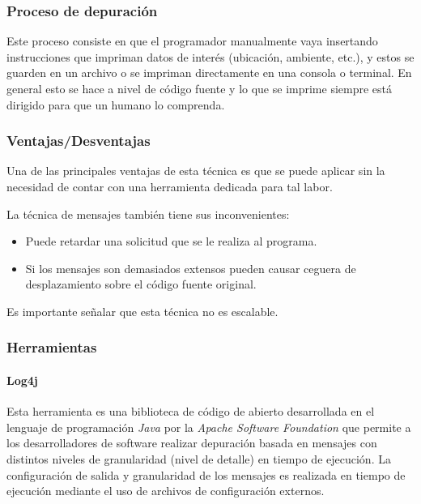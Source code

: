 \documentclass[12pt,legalpaper]{report}
\begin{document}
			\subsubsection{Proceso de depuración}

Este proceso consiste en que el programador manualmente vaya insertando instrucciones que impriman datos de interés (ubicación, ambiente, etc.), y estos se guarden en un archivo o se impriman directamente en una consola o terminal.  En general esto se hace a nivel de código fuente y lo que se imprime siempre está dirigido para que un humano lo comprenda.

			\subsubsection{Ventajas/Desventajas}

Una de las principales ventajas de esta técnica es que se puede aplicar sin la necesidad de contar con una herramienta dedicada para tal labor.

La técnica de mensajes también tiene sus inconvenientes:
\begin{itemize}
	\item Puede retardar una solicitud que se le realiza al programa. 
	\item Si los mensajes son demasiados extensos pueden causar ceguera de desplazamiento sobre el código fuente original.
\end{itemize}	
Es importante señalar que esta técnica no es escalable.  


			\subsubsection{Herramientas}
				\paragraph{Log4j}
			  			
Esta herramienta \cite{log4j} es una biblioteca de código de abierto desarrollada en el lenguaje de programación \textit{Java} por la \textit{Apache Software Foundation} que permite a los desarrolladores de software realizar depuración basada en mensajes con distintos niveles de granularidad (nivel de detalle) en tiempo de ejecución. La configuración de salida y granularidad de los mensajes es realizada en tiempo de ejecución mediante el uso de archivos de configuración externos.
\end{document}
